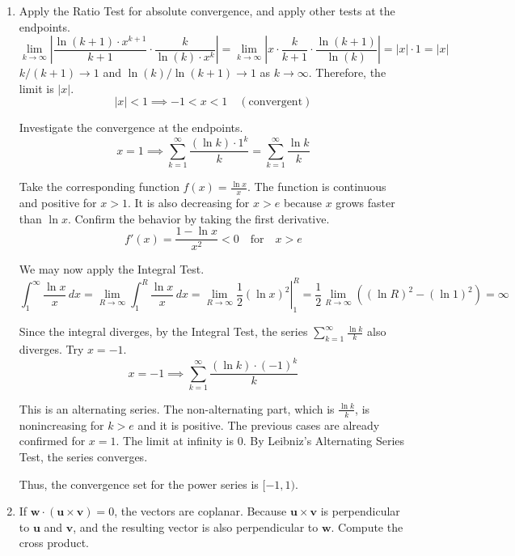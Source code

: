 \documentclass[a4paper, 12pt]{article}
\begin{document}
\begin{enumerate}[leftmargin=*,label=\textbf{\arabic*.}]
\item Apply the Ratio Test for absolute convergence, and apply other tests at the endpoints.
\[\lim_{k\to\infty}\left|\frac{\ln(k+1)\cdot x^{k+1}}{k+1}\cdot\frac k{\ln(k)\cdot x^k}\right|=\lim_{k\to\infty}\left|x\cdot\frac{k}{k+1}\cdot\frac{\ln(k+1)}{\ln(k)}\right|=|x|\cdot1=|x|\]
$k/(k+1)\to1$ and $\ln(k)/\ln(k+1)\to1$ as $k\to\infty$. Therefore, the limit is $|x|$.
\[|x|<1\implies-1<x<1\quad(\text{convergent})\]

Investigate the convergence at the endpoints.
\[x=1\implies \sum_{k=1}^{\infty}\frac{(\ln k)\cdot 1^k}{k}=\sum_{k=1}^{\infty}\frac{\ln k}{k}\]

Take the corresponding function $f(x)=\frac{\ln x}x$. The function is continuous and positive for $x>1$. It is also decreasing for $x>{e}$ because $x$ grows faster than $\ln x$. Confirm the behavior by taking the first derivative.
\[f'(x)=\frac{1-\ln x}{x^2}<0\quad\text{for}\quad x> e\]

We may now apply the Integral Test.
\[\int_1^{\infty}\frac{\ln x}x\,dx=\lim_{R\to\infty}\int_1^R\frac{\ln x}x\,dx=\lim_{R\to\infty}\left.\frac12\left(\ln x\right)^2\right|_1^R=\frac12\lim_{R\to\infty}\left((\ln R)^2-(\ln1)^2\right)=\infty\]

Since the integral diverges, by the Integral Test, the series $\sum_{k=1}^{\infty}\frac{\ln k}k$ also diverges. Try $x=-1$.
\[x=-1\implies \sum_{k=1}^{\infty}\frac{(\ln k)\cdot(-1)^k}{k}\]

This is an alternating series. The non-alternating part, which is $\frac{\ln k}k$, is nonincreasing for $k>{e}$ and it is positive. The previous cases are already confirmed for $x=1$. The limit at infinity is $0$. By Leibniz's Alternating Series Test, the series converges.

Thus, the convergence set for the power series is $\boxed{[-1,1)}$.

\item If $\mathbf{w}\cdot(\mathbf{u}\times\mathbf{v})=0$, the vectors are coplanar. Because $\mathbf{u}\times\mathbf{v}$ is perpendicular to $\mathbf u$ and $\mathbf v$, and the resulting vector is also perpendicular to $\mathbf w$. Compute the cross product.


\end{enumerate}
\end{document}
